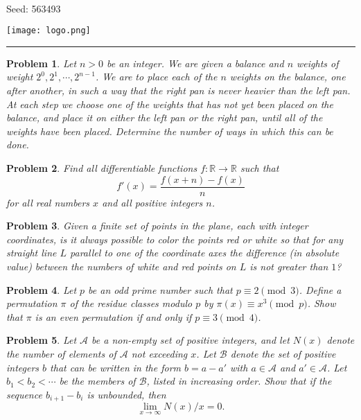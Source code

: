 \documentclass[12pt]{article}
\newtheorem{opg}{Problem}
\begin{document}
\parbox{0.6\textwidth}{ \\[2ex] {\Large Seed: 563493}}
\parbox{0.4\textwidth}{\texttt{[image: logo.png]}}

\hrule

\begin{opg}
Let $n > 0$ be an integer. We are given a balance and $n$ weights of weight $2^0,2^1, \cdots ,2^{n-1}$.  We are to place each of	the $n$ weights on the balance, one after another, in such a way that the right pan is never heavier than the left pan.  At each step we choose one of the weights that has not yet been placed on the balance, and place it on either the left pan or the right pan, until all of the weights have been placed.
Determine the number of ways in which this can be done.


\end{opg}
\begin{opg}
Find all differentiable functions $f:\mathbb{R} \to \mathbb{R}$ such that
\[
f'(x) = \frac{f(x+n)-f(x)}{n}
\]
for all real numbers $x$ and all positive integers $n$.

\end{opg}
\begin{opg}
Given a finite set of points in the plane, each with integer coordinates, is it always possible to color the points red or white so that for any straight line $L$ parallel to one of the coordinate axes the difference (in absolute value) between the numbers of white and red points on $L$ is not greater than $1$?


\end{opg}
\begin{opg}
Let $p$ be an odd prime number such that $p \equiv 2 \pmod{3}$. Define a permutation $\pi$ of the
residue classes modulo $p$ by $\pi(x) \equiv x^3 \pmod{p}$. Show that $\pi$ is an even permutation
if and only if $p \equiv 3 \pmod{4}$.

\end{opg}
\begin{opg}
Let $\mathcal{A}$
be a non-empty set of positive integers, and let $N(x)$ denote
the number of elements of $\mathcal{A}$ not exceeding $x$.
Let $\mathcal{B}$ denote the set
of positive integers $b$ that can be written in the form $b = a - a'$ with
$a \in \mathcal{A}$  and $a' \in  \mathcal{A}$. Let $b_1 < b_2 < \cdots$
be the members of $\mathcal{B}$,
listed in increasing order. Show that if the sequence $b_{i+1} - b_i$ is
unbounded, then
\[
\lim_{x \to\infty}  N(x)/x  = 0.
\]

\end{opg}
\end{document}
